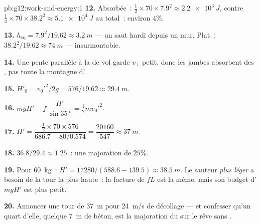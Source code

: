 \begin{solution}{pb:g12:work-and-energy:1}
\textbf{12.} Absorbée~: $\tfrac12 \times 70 \times 7.9^2 \approx
\qty{2.2e3}{J}$, contre $\tfrac12 \times 70 \times 38.2^2 \approx
\qty{5.1e4}{J}$ au total~: environ $4\%$.

\textbf{13.} $h_{\text{eq}} = 7.9^2/19.62 \approx \qty{3.2}{m}$ ---
un saut hardi depuis un mur. Plat~: $38.2^2/19.62 \approx
\qty{74}{m}$ --- insurmontable.

\textbf{14.} Une pente parallèle à la  de vol garde
$v_\perp$ petit, donc les jambes absorbent des
, pas toute la montagne d'.

\textbf{15.} $H'_0 = v_0'^2/2g = 576/19.62 \approx \qty{29.4}{m}$.

\textbf{16.} $mgH' - f\,\dfrac{H'}{\sin\qty{35}{\degree}} =
\tfrac12 m v_0'^2$.

\textbf{17.} $H' = \dfrac{\tfrac12 \times 70 \times 576}
{686.7 - 80/0.574} = \dfrac{\num{20160}}{547} \approx \qty{37}{m}$.

\textbf{18.} $36.8/29.4 \approx 1.25$~: une majoration de $25\%$.

\textbf{19.} Pour \qty{60}{kg}~: $H' = \num{17280}/(588.6 - 139.5)
\approx \qty{38.5}{m}$. Le sauteur \emph{plus léger} a besoin de la
tour la plus haute~: la facture de  $fL$ est la
même, mais son budget d' $mgH'$ est plus
petit.

\textbf{20.} Annoncer une tour de \qty{37}{m} pour \qty{24}{m/s} de
décollage --- et confesser qu'un quart d'elle, quelque \qty{7}{m} de
béton, est la majoration du  sur le rêve sans
.
\end{solution}
